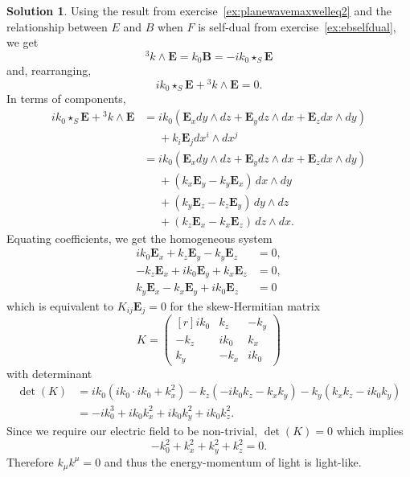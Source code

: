 \documentclass[11pt, a4paper]{report}
\theoremstyle{definition}
\newtheorem{sol}{Solution}[part]
\begin{document}
\begin{sol}


Using the result from exercise~\ref{ex:planewavemaxwelleq2} and the relationship between $E$ and $B$ when $F$ is self-dual from exercise~\ref{ex:ebselfdual}, we get
\[
    ^3 k \wedge \mathbf{E} = k_0 \mathbf{B} = -ik_0 \star_S \mathbf{E}
\]
and, rearranging,
\[
    ik_0 \star_S \mathbf{E} + {}^3 k \wedge \mathbf{E} = 0.
\]
In terms of components,
\begin{align*}
    ik_0 \star_S \mathbf{E} + {}^3 k \wedge \mathbf{E}
        &= ik_0 (\mathbf{E}_x dy \wedge dz
                 + \mathbf{E}_y dz \wedge dx
                 + \mathbf{E}_z dx \wedge dy) \\
        &\mathrel{\phantom{=}}{} + k_i \mathbf{E}_j dx^i \wedge dx^j \\
        &= ik_0 (\mathbf{E}_x dy \wedge dz
                 + \mathbf{E}_y dz \wedge dx
                 + \mathbf{E}_z dx \wedge dy) \\
        &\mathrel{\phantom{=}}{} + (k_x \mathbf{E}_y - k_y \mathbf{E}_x) \, dx \wedge dy \\
        &\mathrel{\phantom{=}}{} + (k_y \mathbf{E}_z - k_z \mathbf{E}_y) \, dy \wedge dz \\
        &\mathrel{\phantom{=}}{} + (k_z \mathbf{E}_x - k_x \mathbf{E}_z) \, dz \wedge dx.
\end{align*}
Equating coefficients, we get the homogeneous system
\begin{align*}
    ik_0 \mathbf{E}_x + k_z \mathbf{E}_y - k_y \mathbf{E}_z &= 0, \\
    -k_z \mathbf{E}_x + ik_0 \mathbf{E}_y + k_x \mathbf{E}_z &= 0, \\
    k_y \mathbf{E}_x - k_x \mathbf{E}_y + ik_0 \mathbf{E}_z &= 0
\end{align*}
which is equivalent to $K_{ij} \mathbf{E}_j = 0$ for the skew-Hermitian matrix
\[
    K = \begin{pmatrix*}[r]
            ik_0 & k_z & -k_y \\
            -k_z & ik_0 & k_x \\
            k_y & -k_x & ik_0
        \end{pmatrix*}
\]
with determinant
\begin{align*}
    \det(K) &= ik_0 (ik_0 \cdot ik_0 + k_x^2) - k_z(-ik_0 k_z - k_x k_y) - k_y (k_x k_z - ik_0 k_y) \\
            &= -i k_0^3 + ik_0 k_x^2 + ik_0 k_y^2 + ik_0 k_z^2.
\end{align*}
Since we require our electric field to be non-trivial, $\det(K) = 0$ which implies
\[
    -k_0^2 + k_x^2 + k_y^2 + k_z^2 = 0.
\]
Therefore $k_\mu k^\mu = 0$ and thus the energy-momentum of light is light-like.

\end{sol}
\end{document}
